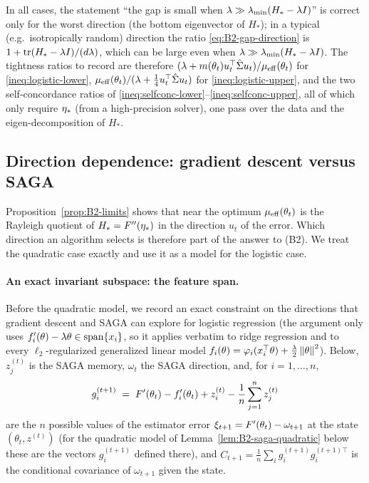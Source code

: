 In all cases, the statement ``the gap is small when $\lambda\gg\lambda_{\min}(H_\ast-\lambda I)$'' is correct only
for the worst direction (the bottom eigenvector of $H_\ast$); in a typical (e.g.\ isotropically random)
direction the ratio \eqref{eq:B2-gap-direction} is $1+\operatorname{tr}(H_\ast-\lambda I)/(d\lambda)$, which can be large even
when $\lambda\gg\lambda_{\min}(H_\ast-\lambda I)$. The tightness ratios to record are therefore
$(\lambda+m(\theta_t)u_t^\top\hat\Sigma u_t)/\mu_{\mathrm{eff}}(\theta_t)$ for \eqref{ineq:logistic-lower},
$\mu_{\mathrm{eff}}(\theta_t)/(\lambda+\frac14u_t^\top\hat\Sigma u_t)$ for \eqref{ineq:logistic-upper}, and the two
self-concordance ratios of \eqref{ineq:selfconc-lower}--\eqref{ineq:selfconc-upper}, all of which only require
$\eta_\ast$ (from a high-precision solver), one pass over the data and the eigen-decomposition of $H_\ast$.

\subsection{Direction dependence: gradient descent versus SAGA}\label{sec:B2-direction}

Proposition~\ref{prop:B2-limits} shows that near the optimum $\mu_{\mathrm{eff}}(\theta_t)$ is the Rayleigh quotient of
$H_\ast=F''(\eta_\ast)$ in the direction $u_t$ of the error. Which direction an algorithm selects is therefore
part of the answer to (B2). We treat the quadratic case exactly and use it as a model for the logistic case.

\paragraph{An exact invariant subspace: the feature span.}
Before the quadratic model, we record an exact constraint on the directions that gradient descent and SAGA can
explore for logistic regression (the argument only uses $f'_i(\theta)-\lambda\theta\in\operatorname{span}\{x_i\}$, so it
applies verbatim to ridge regression and to every $\ell_2$-regularized generalized linear model
$f_i(\theta)=\varphi_i(x_i^\top\theta)+\frac\lambda2\left\|\theta\right\|^2$). Below, $z_j^{(t)}$ is the SAGA memory,
$\omega_t$ the SAGA direction, and, for $i=1,\dots,n$,
\[
g_i^{(t+1)}\;=\;F'(\theta_t)-f'_i(\theta_t)+z_i^{(t)}-\frac1n\sum_{j=1}^nz_j^{(t)}
\]
are the $n$ possible values of the estimator error $\xi_{t+1}=F'(\theta_t)-\omega_{t+1}$ at the state $(\theta_t,z^{(t)})$
(for the quadratic model of Lemma~\ref{lem:B2-saga-quadratic} below these are the vectors $g_i^{(t+1)}$ defined there), and
$C_{t+1}=\frac1n\sum_ig_i^{(t+1)}g_i^{(t+1)\top}$ is the conditional covariance of $\omega_{t+1}$ given the state.

